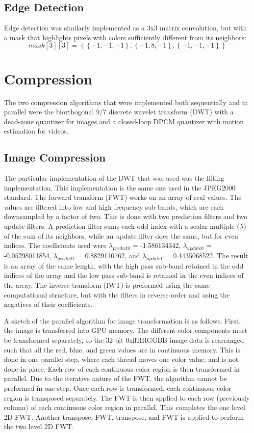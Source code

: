 \documentclass[10pt,twocolumn,twoside]{IEEEtran}
\begin{document}
\subsection{Edge Detection}
Edge detection was similarly implemented as a 3x3 matrix convolution, but with a mask that highlights pixels with colors sufficiently different from its neighbors:
\begin{equation*}
mask[3][3] = \left\{ \left\{-1, -1, -1\right\}, \left\{-1, 8, -1\right\}, \left\{-1, -1, -1\right\} \right\}
\end{equation*}

\section{Compression}
The two compression algorithms that were implemented both sequentially and in parallel were the biorthogonal 9/7 discrete wavelet transform (DWT) with a dead-zone quantizer for images and a closed-loop DPCM quantizer with motion estimation for videos.

\subsection{Image Compression}
	
The particular implementation of the DWT that was used was the lifting implementation. This implementation is the same one used in the JPEG2000 standard. The forward transform (FWT) works on an array of real values. The values are filtered into low and high frequency sub-bands, which are each downsampled by a factor of two. This is done with two prediction filters and two update filters. A prediction filter sums each odd index with a scalar multiple ($\lambda$) of the sum of its neighbors, while an update filter does the same, but for even indices. The coefficients used were $\lambda_{predict0}$ = -1.586134342, $\lambda_{update0}$ = -0.05298011854, $\lambda_{predict1}$ = 0.8829110762, and $\lambda_{update1}$ = 0.4435068522. The result is an array of the same length, with the high pass sub-band retained in the odd indices of the array and the low pass sub-band is retained in the even indices of the array. The inverse transform (IWT) is preformed using the same computational structure, but with the filters in reverse order and using the negatives of their coefficients.

A sketch of the parallel algorithm for image transformation is as follows. First, the image is transferred into GPU memory. The different color components must be transformed separately, so the 32 bit 0xffRRGGBB image data is rearranged such that all the red, blue, and green values are in continuous memory. This is done in one parallel step, where each thread moves one color value, and is not done in-place. Each row of each continuous color region is then transformed in parallel. Due to the iterative nature of the FWT, the algorithm cannot be preformed in one step. Once each row is transformed, each continuous color region is transposed separately. The FWT is then applied to each row (previously column) of each continuous color region in parallel. This completes the one level 2D FWT. Another transpose, FWT, transpose, and FWT is applied to perform the two level 2D FWT.
\end{document}
